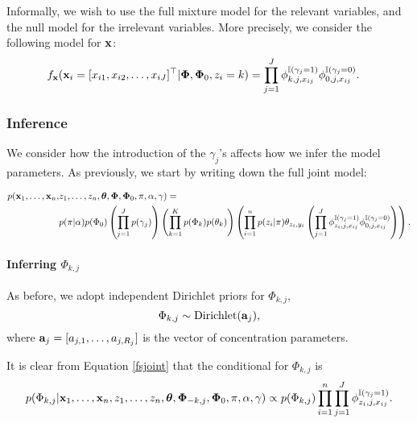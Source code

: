 \documentclass[12pt]{article}
\begin{document}
Informally, we wish to use the full mixture model for the relevant variables, and the null model for the irrelevant variables. More precisely, we consider the following model for ${\bf x}$:
\begin{align}      
 f_{\bf x}({\bf x}_i = [x_{i1}, x_{i2}, \ldots, x_{iJ}]^\top|\boldsymbol{\Phi}, \boldsymbol{\Phi}_0, z_ i = k)
 &= \prod_{j = 1}^J  \phi_{k,j,x_{ij}}^{\mathbb{I}(\gamma_j=1)}\phi_{0,j,x_{ij}}^{\mathbb{I}(\gamma_j=0)}.\label{likeliprod2}
\end{align}

\subsubsection{Inference}
We consider how the introduction of the $\gamma_j$'s affects how we infer the model parameters.  As previously, we start by writing down the full joint model:

\begin{equation}
\begin{split}
p({\bf x}_1,\ldots, {\bf x}_n,&z_1, \ldots, z_n, \boldsymbol{\theta}, \boldsymbol{\Phi}, \boldsymbol{\Phi}_0, \pi, \alpha, \gamma) =\\ &p(\pi|\alpha)p(\Phi_0)\left(\prod_{j=1}^Jp(\gamma_j)\right)\left(\prod_{k = 1}^K  p(\Phi_k)p(\theta_k) \right)\left(\prod_{i=1}^n   p(z_i | \pi) \theta_{z_i, y_i} \left(\prod_{j=1}^J  \phi_{z_i,j,x_{ij}}^{\mathbb{I}(\gamma_j=1)}\phi_{0,j,x_{ij}}^{\mathbb{I}(\gamma_j=0)} \right)\right).\label{fsjoint}
\end{split}
\end{equation}


\paragraph{Inferring $\Phi_{k,j}$}
As before, we adopt independent Dirichlet priors for $\Phi_{k,j}$, 
\begin{equation}
\Phi_{k,j} \sim \mbox{Dirichlet}({\bf a}_j),\label{prior1}
\end{equation}
where ${\bf a}_j = [a_{j,1}, \ldots, a_{j,R_j}]$ is the vector of concentration parameters.  

It is clear from Equation \eqref{fsjoint} that the conditional for $\Phi_{k,j}$ is
\begin{equation}
p(\Phi_{k,j}|{\bf x}_1,\ldots, {\bf x}_n,z_1, \ldots, z_n, \boldsymbol{\theta}, \boldsymbol{\Phi}_{-{k,j}}, \boldsymbol{\Phi}_0, \pi, \alpha, \gamma) \propto p(\Phi_{k,j}) \prod_{i=1}^n  \prod_{j=1}^J  \phi_{z_i,j,x_{ij}}^{\mathbb{I}(\gamma_j=1)}.
\end{equation}
\end{document}
